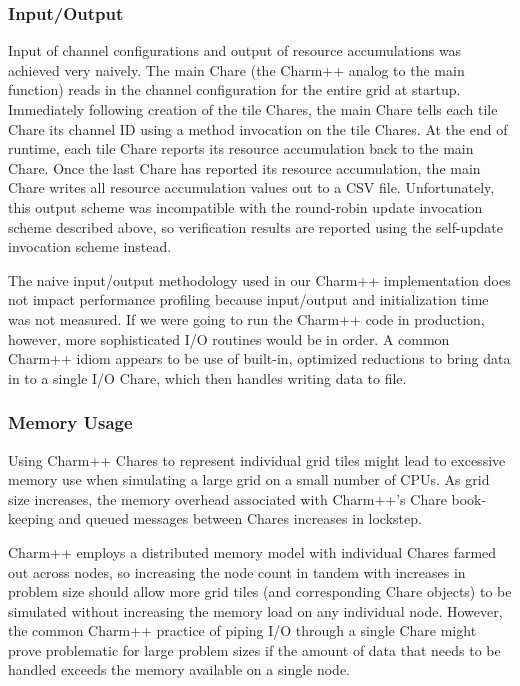 \subsubsection{Input/Output}

Input of channel configurations and output of resource accumulations was achieved very naively.
The main Chare (the Charm++ analog to the main function) reads in the channel configuration for the entire grid at startup.
Immediately following creation of the tile Chares, the main Chare tells each tile Chare its channel ID using a method invocation on the tile Chares.
At the end of runtime, each tile Chare reports its resource accumulation back to the main Chare.
Once the last Chare has reported its resource accumulation, the main Chare writes all resource accumulation values out to a CSV file.
Unfortunately, this output scheme was incompatible with the round-robin update invocation scheme described above, so verification results are reported using the self-update invocation scheme instead.

The naive input/output methodology used in our Charm++ implementation does not impact performance profiling because input/output and initialization time was not measured.
If we were going to run the Charm++ code in production, however, more sophisticated I/O routines would be in order.
A common Charm++ idiom appears to be use of built-in, optimized reductions to bring data in to a single I/O Chare, which then handles writing data to file.

\subsubsection{Memory Usage}

Using Charm++ Chares to represent individual grid tiles might lead to excessive memory use when simulating a large grid on a small number of CPUs.
As grid size increases, the memory overhead associated with Charm++'s Chare book-keeping and queued messages between Chares increases in lockstep.

Charm++ employs a distributed memory model with individual Chares farmed out across nodes, so increasing the node count in tandem with increases in problem size should allow more grid tiles (and corresponding Chare objects) to be simulated without increasing the memory load on any individual node.
However, the common Charm++ practice of piping I/O through a single Chare might prove problematic for large problem sizes if the amount of data that needs to be handled exceeds the memory available on a single node.


